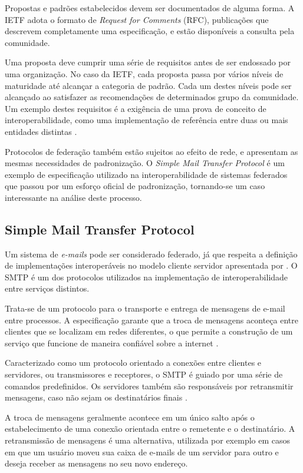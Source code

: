 Propostas e padrões estabelecidos devem ser documentados de alguma forma. A IETF
adota o formato de \textit{Request for Comments} (RFC), publicações que descrevem
completamente uma especificação, e estão disponíveis a consulta pela comunidade.

Uma proposta deve cumprir uma série de requisitos antes de ser endossado por uma
organização. No caso da IETF, cada proposta passa por vários níveis de maturidade
até alcançar a categoria de padrão. Cada um destes níveis pode ser alcançado ao
satisfazer as recomendações de determinados grupo da comunidade. Um exemplo destes
requisitos é a exigência de uma prova de conceito de interoperabilidade, como uma
implementação de referência entre duas ou mais entidades distintas \cite{rfc1280}.

Protocolos de federação também estão sujeitos ao efeito de rede, e apresentam as
mesmas necessidades de padronização. O \textit{Simple Mail Transfer Protocol} é um
exemplo de especificação utilizado na interoperabilidade de sistemas federados que
passou por um esforço oficial de padronização, tornando-se um caso interessante na
análise deste processo.


\subsection{Simple Mail Transfer Protocol}

Um sistema de \textit{e-mails} pode ser considerado federado, já que respeita a
definição de implementações interoperáveis no modelo cliente servidor apresentada
por \cite{barocas2012}. O SMTP é um dos protocolos utilizados na implementação de
interoperabilidade entre serviços distintos.

Trata-se de um protocolo para o transporte e entrega de mensagens de e-mail entre
processos. A especificação garante que a troca de mensagens aconteça entre clientes
que se localizam em redes diferentes, o que permite a construção de um serviço que
funcione de maneira confiável sobre a internet \cite{rfc2821}.

Caracterizado como um protocolo orientado a conexões entre clientes e servidores, ou
transmissores e receptores, o SMTP é guiado por uma série de comandos predefinidos.
Os servidores também são responsáveis por retransmitir mensagens, caso não sejam os
destinatários finais \cite{kurose2012}.

A troca de mensagens geralmente acontece em um único salto após o estabelecimento de
uma conexão orientada entre o remetente e o destinatário. A retransmissão de
mensagens é uma alternativa, utilizada por exemplo em casos em que um usuário moveu
sua caixa de e-mails de um servidor para outro e deseja receber as mensagens no seu
novo endereço.

